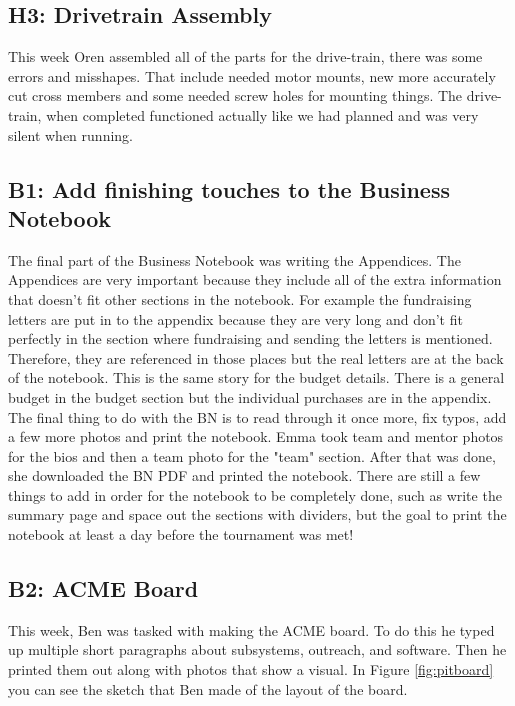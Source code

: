 \documentclass{article}
\begin{document}
\subsection{H3: Drivetrain Assembly}

This week Oren assembled all of the parts for the drive-train, there was some errors and misshapes. That include needed motor mounts, new more accurately cut cross members and some needed screw holes for mounting things. The drive-train, when completed functioned actually like we had planned and was very silent when running.    
\subsection{B1: Add finishing touches to the Business Notebook}

The final part of the Business Notebook was writing the Appendices. The Appendices are very important because they include all of the extra information that doesn't fit other sections in the notebook. For example the fundraising letters are put in to the appendix because they are very long and don't fit perfectly in the section where fundraising and sending the letters is mentioned. Therefore, they are referenced in those places but the real letters are at the back of the notebook. This is the same story for the budget details. There is a general budget in the budget section but the individual purchases are in the appendix. \\
The final thing to do with the BN is to read through it once more, fix typos, add a few more photos and print the notebook. Emma took team and mentor photos for the bios and then a team photo for the "team" section. After that was done, she downloaded the BN PDF and printed the notebook. There are still a few things to add in order for the notebook to be completely done, such as write the summary page and space out the sections with dividers, but the goal to print the notebook at least a day before the tournament was met!

\subsection{B2: ACME Board}

This week, Ben was tasked with making the ACME board. To do this he typed up multiple short paragraphs about subsystems, outreach, and software. Then he printed them out along with photos that show a visual. In Figure \ref{fig:pitboard} you can see the sketch that Ben made of the layout of the board. 
\end{document}
